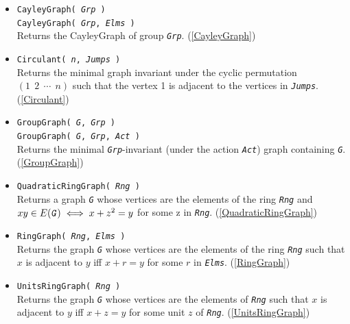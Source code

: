 \documentclass[a4paper,11pt]{report}
\begin{document}
{{\begin{itemize}
\item \texttt{CayleyGraph( \mbox{\texttt{\mdseries\slshape Grp}} )}\\
 \texttt{CayleyGraph( \mbox{\texttt{\mdseries\slshape Grp}}, \mbox{\texttt{\mdseries\slshape Elms}} )}\\
 Returns the CayleyGraph of group \mbox{\texttt{\mdseries\slshape Grp}}. (\ref{CayleyGraph}) 
\item \texttt{Circulant( \mbox{\texttt{\mdseries\slshape n}}, \mbox{\texttt{\mdseries\slshape Jumps}} )}\\
 Returns the minimal graph invariant under the cyclic permutation $(1\;\,2\;\,\cdots\;\,n)$ such that the vertex 1 is adjacent to the vertices in \mbox{\texttt{\mdseries\slshape Jumps}}. (\ref{Circulant}) 
\item \texttt{GroupGraph( \mbox{\texttt{\mdseries\slshape G}}, \mbox{\texttt{\mdseries\slshape Grp}} )}\\
 \texttt{GroupGraph( \mbox{\texttt{\mdseries\slshape G}}, \mbox{\texttt{\mdseries\slshape Grp}}, \mbox{\texttt{\mdseries\slshape Act}} )}\\
 Returns the minimal \mbox{\texttt{\mdseries\slshape Grp}}-invariant (under the action \mbox{\texttt{\mdseries\slshape Act}}) graph containing \mbox{\texttt{\mdseries\slshape G}}. (\ref{GroupGraph}) 
\item \texttt{QuadraticRingGraph( \mbox{\texttt{\mdseries\slshape Rng}} )}\\
 Returns a graph \mbox{\texttt{\mdseries\slshape G}} whose vertices are the elements of the ring \mbox{\texttt{\mdseries\slshape Rng}} and $xy\in E(\mbox{\texttt{\mdseries\slshape G}}) \iff x+z^2=y$ for some z in \mbox{\texttt{\mdseries\slshape Rng}}. (\ref{QuadraticRingGraph}) 
\item \texttt{RingGraph( \mbox{\texttt{\mdseries\slshape Rng}}, \mbox{\texttt{\mdseries\slshape Elms}} )}\\
 Returns the graph \mbox{\texttt{\mdseries\slshape G}} whose vertices are the elements of the ring \mbox{\texttt{\mdseries\slshape Rng}} such that $x$ is adjacent to $y$ iff $x+r=y$ for some $r$ in \mbox{\texttt{\mdseries\slshape Elms}}. (\ref{RingGraph}) 
\item \texttt{UnitsRingGraph( \mbox{\texttt{\mdseries\slshape Rng}} )}\\
 Returns the graph \mbox{\texttt{\mdseries\slshape G}} whose vertices are the elements of \mbox{\texttt{\mdseries\slshape Rng}} such that $x$ is adjacent to $y$ iff $x+z=y$ for some unit $z$ of \mbox{\texttt{\mdseries\slshape Rng}}. (\ref{UnitsRingGraph}) 
\end{itemize}
 }

}
\end{document}
